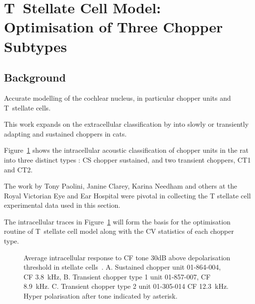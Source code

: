  

\section[TS Cell Model]{T~Stellate Cell Model: Optimisation of Three Chopper Subtypes}

\subsection{Background}
 
Accurate modelling of the cochlear nucleus, in particular chopper units and T~stellate cells.

This work expands on the extracellular classification by \citep{BlackburnSachs:1989} into slowly or transiently adapting and sustained choppers in cats.


Figure~\ref{fig:PaoliniAIV} shows the intracellular acoustic classification of chopper units in the rat into three distinct types \citep{PaoliniClareyEtAl:2005}: CS chopper sustained, and two transient choppers, CT1 and CT2.

The work by Tony Paolini, Janine Clarey, Karina Needham and others at the Royal Victorian Eye and Ear Hospital were pivotal in collecting the T stellate cell experimental data used in this section.

The intracellular traces in Figure~\ref{fig:PaoliniAIV} will form the basis for the optimisation routine of T~stellate cell model along with the CV statistics of each chopper type.  

\begin{figure}[htb]
\centering%
\hfill%
\hfill%
\caption[Average intracellular response data in stellate cells in rats.]{Average intracellular response to CF tone 30dB above depolarisation threshold in stellate  cells~\citep[Reproduced from Fig.~2, ][]{PaoliniClareyEtAl:2005}.
A. Sustained chopper unit 01-864-004, CF 3.8~kHz,
B. Transient chopper type 1 unit 01-857-007, CF 8.9~kHz.
C. Transient chopper type 2 unit 01-305-014 CF 12.3~kHz.
Hyper polarisation after tone indicated by asterisk.  \label{fig:PaoliniAIV}}
\end{figure}

